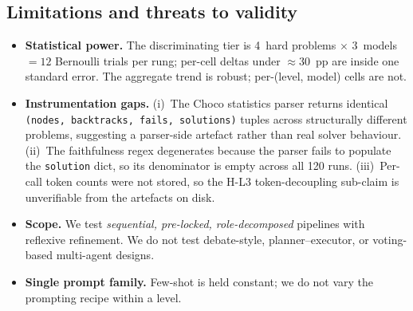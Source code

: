 \documentclass[11pt,a4paper]{article}
\begin{document}
\subsection{Limitations and threats to validity}
\begin{itemize}[leftmargin=1.2cm,itemsep=1pt,topsep=2pt]
\item \textbf{Statistical power.} The discriminating tier is 4~hard problems
$\times$ 3~models $=12$ Bernoulli trials per rung; per-cell deltas under
$\approx 30$~pp are inside one standard error. The aggregate trend is
robust; per-(level, model) cells are not.
\item \textbf{Instrumentation gaps.} (i)~The Choco statistics parser
returns identical \texttt{(nodes, backtracks, fails, solutions)} tuples
across structurally different problems, suggesting a parser-side artefact
rather than real solver behaviour. (ii)~The faithfulness regex degenerates
because the parser fails to populate the \texttt{solution} dict, so its
denominator is empty across all 120 runs. (iii)~Per-call token counts
were not stored, so the H-L3 token-decoupling sub-claim is unverifiable
from the artefacts on disk.
\item \textbf{Scope.} We test \emph{sequential, pre-locked, role-decomposed}
pipelines with reflexive refinement. We do not test debate-style,
planner--executor, or voting-based multi-agent designs.
\item \textbf{Single prompt family.} Few-shot is held constant; we do not
vary the prompting recipe within a level.
\end{itemize}
\end{document}
